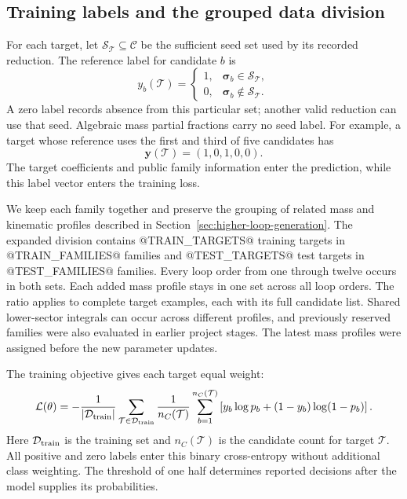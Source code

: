 \subsection{Training labels and the grouped data division}
\label{sec:seed-model-split}
For each target, let $\mathcal S_{\mathcal T}\subseteq\mathcal C$
be the sufficient seed set used by its recorded reduction.
The reference label for candidate $b$ is
\begin{equation}
 y_b(\mathcal T)=
 \begin{cases}
 1,&\boldsymbol\sigma_b\in\mathcal S_{\mathcal T},\\
 0,&\boldsymbol\sigma_b\notin\mathcal S_{\mathcal T}.
 \end{cases}
 \label{eq:seed-membership-label}
\end{equation}
A zero label records absence from this particular set; another valid
reduction can use that seed. Algebraic mass partial fractions carry
no seed label. For example, a target whose reference uses the first
and third of five candidates has
\begin{equation}
 \boldsymbol y(\mathcal T)=(1,0,1,0,0).
 \label{eq:seed-label-example}
\end{equation}
The target coefficients and public family information enter the
prediction, while this label vector enters the training loss.

We keep each family together and preserve the grouping of related
mass and kinematic profiles described in
Section~\ref{sec:higher-loop-generation}. The expanded division
contains @TRAIN_TARGETS@ training targets in @TRAIN_FAMILIES@
families and @TEST_TARGETS@ test targets in @TEST_FAMILIES@
families. Every loop order from one through twelve occurs in both
sets. Each added mass profile stays in one set across all loop orders.
The ratio applies to complete target examples, each with its full
candidate list. Shared lower-sector integrals can occur across
different profiles, and previously reserved families were also
evaluated in earlier project stages. The latest mass profiles were
assigned before the new parameter updates.

The training objective gives each target equal weight:
\begin{equation}
 \mathcal L(\theta)=
 -\frac{1}{|\mathcal D_{\rm train}|}
 \sum_{\mathcal T\in\mathcal D_{\rm train}}
 \frac{1}{n_C(\mathcal T)}
 \sum_{b=1}^{n_C(\mathcal T)}
 \left[y_b\log p_b+(1-y_b)\log(1-p_b)\right].
 \label{eq:seed-training-loss}
\end{equation}
Here $\mathcal D_{\rm train}$ is the training set and
$n_C(\mathcal T)$ is the candidate count for target $\mathcal T$.
All positive and zero labels enter this binary cross-entropy without
additional class weighting. The threshold of one half determines
reported decisions after the model supplies its probabilities.

